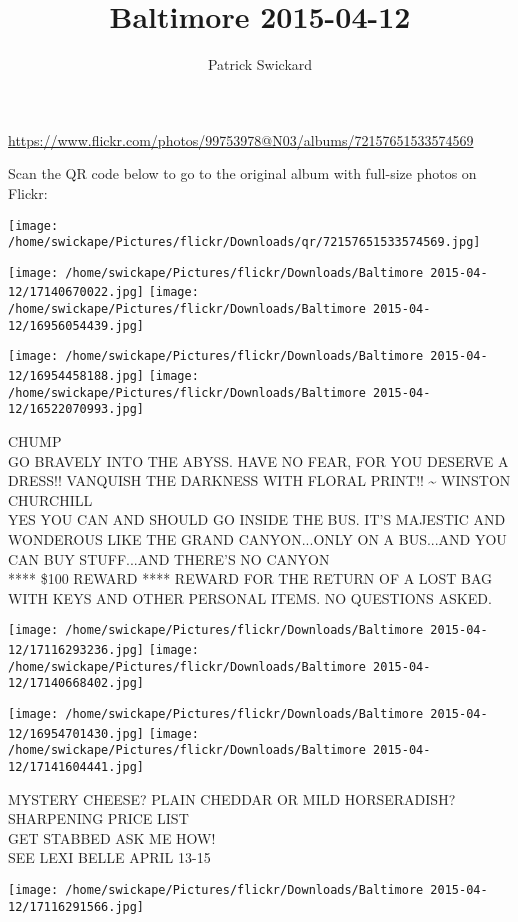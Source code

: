 \documentclass[10pt,letterpaper]{article}
\title{Baltimore 2015-04-12}
\author{Patrick Swickard}
\date{}
\begin{document}
\maketitle

\url{https://www.flickr.com/photos/99753978@N03/albums/72157651533574569}

Scan the QR code below to go to the original album with full-size photos on Flickr:

\texttt{[image: /home/swickape/Pictures/flickr/Downloads/qr/72157651533574569.jpg]}
\pagebreak

\texttt{[image: /home/swickape/Pictures/flickr/Downloads/Baltimore 2015-04-12/17140670022.jpg]}
\texttt{[image: /home/swickape/Pictures/flickr/Downloads/Baltimore 2015-04-12/16956054439.jpg]}

\texttt{[image: /home/swickape/Pictures/flickr/Downloads/Baltimore 2015-04-12/16954458188.jpg]}
\texttt{[image: /home/swickape/Pictures/flickr/Downloads/Baltimore 2015-04-12/16522070993.jpg]}

CHUMP\\
GO BRAVELY INTO THE ABYSS.  HAVE NO FEAR, FOR YOU DESERVE A DRESS!!  VANQUISH THE DARKNESS WITH FLORAL PRINT!!  \textasciitilde{} WINSTON CHURCHILL\\
YES YOU CAN AND SHOULD GO INSIDE THE BUS.  IT'S MAJESTIC AND WONDEROUS LIKE THE GRAND CANYON...ONLY ON A BUS...AND YOU CAN BUY STUFF...AND THERE'S NO CANYON\\
**** \$100 REWARD **** REWARD FOR THE RETURN OF A LOST BAG WITH KEYS AND OTHER PERSONAL ITEMS.  NO QUESTIONS ASKED.
\pagebreak

\texttt{[image: /home/swickape/Pictures/flickr/Downloads/Baltimore 2015-04-12/17116293236.jpg]}
\texttt{[image: /home/swickape/Pictures/flickr/Downloads/Baltimore 2015-04-12/17140668402.jpg]}

\texttt{[image: /home/swickape/Pictures/flickr/Downloads/Baltimore 2015-04-12/16954701430.jpg]}
\texttt{[image: /home/swickape/Pictures/flickr/Downloads/Baltimore 2015-04-12/17141604441.jpg]}

MYSTERY CHEESE?  PLAIN CHEDDAR OR MILD HORSERADISH?\\
SHARPENING PRICE LIST\\
GET STABBED ASK ME HOW!\\
SEE LEXI BELLE APRIL 13{-}15
\pagebreak

\texttt{[image: /home/swickape/Pictures/flickr/Downloads/Baltimore 2015-04-12/17116291566.jpg]}
\end{document}
